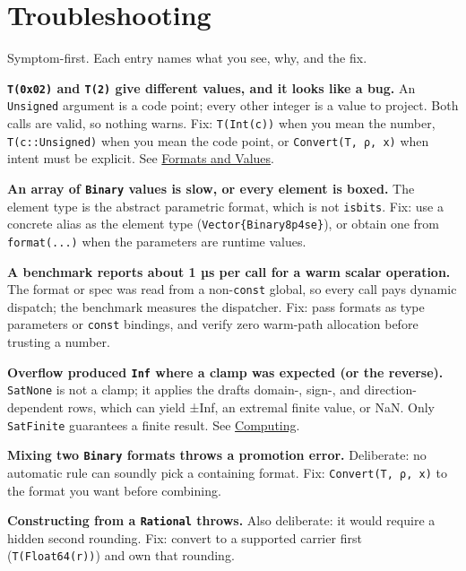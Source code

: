 \chapter{Troubleshooting}



\label{5264174653950164674}{}


Symptom-first. Each entry names what you see, why, and the fix.



\textbf{\texttt{T(0x02)} and \texttt{T(2)} give different values, and it looks like a bug.} An \texttt{Unsigned} argument is a code point; every other integer is a value to project. Both calls are valid, so nothing warns. Fix: \texttt{T(Int(c))} when you mean the number, \texttt{T(c::Unsigned)} when you mean the code point, or \texttt{Convert(T, ρ, x)} when intent must be explicit. See \href{values.md}{Formats and Values}.



\textbf{An array of \texttt{Binary} values is slow, or every element is boxed.} The element type is the abstract parametric format, which is not \texttt{isbits}. Fix: use a concrete alias as the element type (\texttt{Vector\{Binary8p4se\}}), or obtain one from \texttt{format(...)} when the parameters are runtime values.



\textbf{A benchmark reports about 1 µs per call for a warm scalar operation.} The format or spec was read from a non-\texttt{const} global, so every call pays dynamic dispatch; the benchmark measures the dispatcher. Fix: pass formats as type parameters or \texttt{const} bindings, and verify zero warm-path allocation before trusting a number.



\textbf{Overflow produced \texttt{Inf} where a clamp was expected (or the reverse).} \texttt{SatNone} is not a clamp; it applies the draft{\textquotesingle}s domain-, sign-, and direction-dependent rows, which can yield ±Inf, an extremal finite value, or NaN. Only \texttt{SatFinite} guarantees a finite result. See \href{computing.md}{Computing}.



\textbf{Mixing two \texttt{Binary} formats throws a promotion error.} Deliberate: no automatic rule can soundly pick a containing format. Fix: \texttt{Convert(T, ρ, x)} to the format you want before combining.



\textbf{Constructing from a \texttt{Rational} throws.} Also deliberate: it would require a hidden second rounding. Fix: convert to a supported carrier first (\texttt{T(Float64(r))}) and own that rounding.



